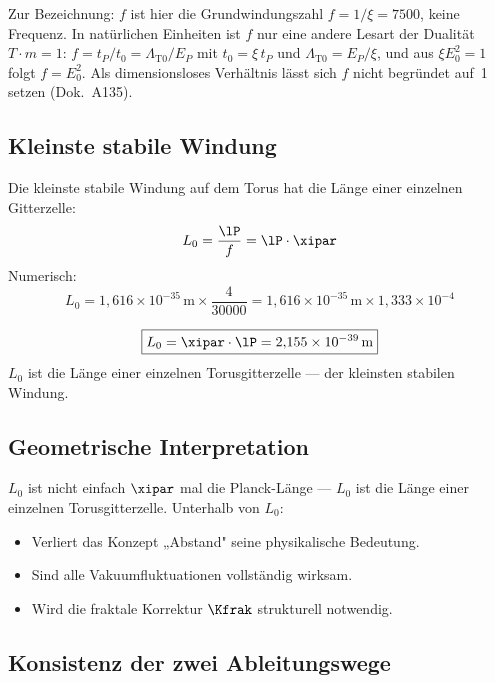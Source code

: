 Zur Bezeichnung: $f$ ist hier die Grundwindungszahl $f = 1/\xi = 7500$, keine Frequenz. In natürlichen Einheiten ist $f$ nur eine andere Lesart der Dualität $T\cdot m = 1$: $f = t_P/t_0 = \Lambda_{\text{T0}}/E_P$ mit $t_0 = \xi\,t_P$ und $\Lambda_{\text{T0}} = E_P/\xi$, und aus $\xi E_0^2 = 1$ folgt $f = E_0^2$. Als dimensionsloses Verhältnis lässt sich $f$ nicht begründet auf~1 setzen (Dok.~A135).

\subsection{Kleinste stabile Windung}

Die kleinste stabile Windung auf dem Torus hat die Länge einer einzelnen Gitterzelle:
\begin{equation}
	L_0 = \frac{\lP}{f} = \lP \cdot \xipar
\end{equation}
Numerisch:
\begin{equation}
	L_0 = 1{,}616 \times 10^{-35}\,\text{m} \times \frac{4}{30000} = 1{,}616 \times 10^{-35}\,\text{m} \times 1{,}333 \times 10^{-4}
\end{equation}

\begin{keyresult}
\begin{equation}
	\boxed{L_0 = \xipar \cdot \lP = 2{,}155 \times 10^{-39}\,\text{m}}
\end{equation}
$L_0$ ist die Länge einer einzelnen Torusgitterzelle — der kleinsten stabilen Windung.
\end{keyresult}

\subsection{Geometrische Interpretation}

$L_0$ ist nicht einfach $\xipar$ mal die Planck-Länge — $L_0$ ist die Länge einer einzelnen Torusgitterzelle. Unterhalb von $L_0$:
\begin{itemize}
	\item Verliert das Konzept „Abstand" seine physikalische Bedeutung.
	\item Sind alle Vakuumfluktuationen vollständig wirksam.
	\item Wird die fraktale Korrektur $\Kfrak$ strukturell notwendig.
\end{itemize}

\subsection{Konsistenz der zwei Ableitungswege}


